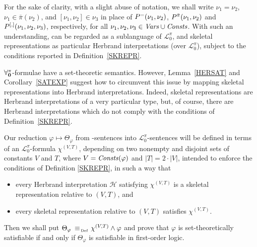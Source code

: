 \documentclass[a4paper]{llncs}
\newcommand{\Elpizero}{\ensuremath{\mathcal{L}_{0}^{\pi}}\xspace}
\newcommand{\nonpairssym}{\bar{\pi}}
\newcommand{\nonpairs}[1]{\nonpairssym(#1)}
\newcommand{\hinter}{\ensuremath{\mathcal{H}}}
\begin{document}
For the sake of clarity, with a slight abuse of notation, we shall
write $\nu_1=\nu_2$, $\nu_1 \in \nonpairs{\nu_2}$, and $[\nu_1, \nu_2]
\in \nu_3$ in place of $P^{=}(\nu_1, \nu_2)$, $P^{\bar{\pi}}(\nu_1,
\nu_2)$ and $P^{[,]}(\nu_1, \nu_2, \nu_3)$, respectively, for all
$\nu_1,\nu_2,\nu_3 \in \mathit{Vars} \cup \mathit{Consts}$.  With such an
understanding, \Forallpizero can be regarded as a sublanguage of
$\Elpizero$, and skeletal representations as particular Herbrand 
interpretations (over \Elpizero), subject to the conditions reported 
in Definition~\ref{SKREPR}.

$\mathbf{\forall_{0}^{\pi}}$-formulae have a set-theoretic semantics.  However, 
Lemma~\ref{HERSAT} and Corollary~\ref{SATEXP} suggest how to 
circumvent this issue by mapping skeletal representations into 
Herbrand interpretations. Indeed, skeletal representations are 
Herbrand interpretations of a very particular type, but, of course, 
there are Herbrand interpretations which do not comply with the 
conditions of Definition~\ref{SKREPR}.

Our reduction $\varphi \mapsto \Theta_{\varphi}$ from 
\Forallpizero-sentences into \Elpizero-sentences will be defined in 
terms of an \Elpizero-formula $\chi^{(V,T)}$, depending on two 
nonempty and disjoint sets of constants $V$ and $T$, where $V = 
\mathit{Consts}(\varphi)$ and $|T| = 2 \cdot |V|$, intended to enforce the 
conditions of Definition \ref{SKREPR}, in such a way that
\begin{itemize}
  \item every Herbrand interpretation $\hinter$ satisfying $\chi^{(V,T)}$
  is a skeletal representation relative to $(V,T)$, and
  \item every skeletal representation relative to $(V,T)$
  satisfies $\chi^{(V,T)}$.
\end{itemize}
Then we shall put $\Theta_{\varphi} \equivAs\, \chi^{(V,T)} \wedge 
\varphi$ and prove that $\varphi$ is set-theoretically satisfiable if 
and only if $\Theta_{\varphi}$ is satisfiable in first-order logic.

\end{document}
